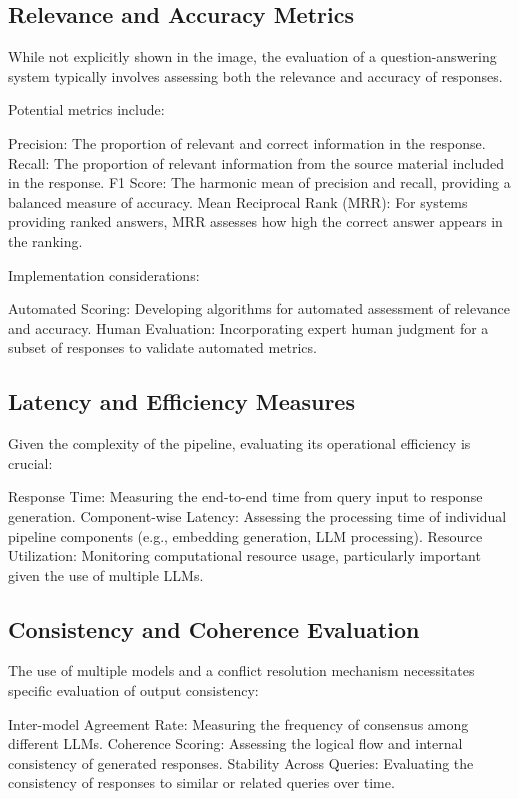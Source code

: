 \subsection{Relevance and Accuracy Metrics}\label{subsec:relevance-and-accuracy-metrics}

While not explicitly shown in the image, the evaluation of a question-answering system typically involves assessing both the relevance and accuracy of responses.

Potential metrics include:

Precision: The proportion of relevant and correct information in the response.
Recall: The proportion of relevant information from the source material included in the response.
F1 Score: The harmonic mean of precision and recall, providing a balanced measure of accuracy.
Mean Reciprocal Rank (MRR): For systems providing ranked answers, MRR assesses how high the correct answer appears in the ranking.

Implementation considerations:

Automated Scoring: Developing algorithms for automated assessment of relevance and accuracy.
Human Evaluation: Incorporating expert human judgment for a subset of responses to validate automated metrics.

\subsection{Latency and Efficiency Measures}\label{subsec:latency-and-efficiency-measures}

Given the complexity of the pipeline, evaluating its operational efficiency is crucial:

Response Time: Measuring the end-to-end time from query input to response generation.
Component-wise Latency: Assessing the processing time of individual pipeline components (e.g., embedding generation, LLM processing).
Resource Utilization: Monitoring computational resource usage, particularly important given the use of multiple LLMs.

\subsection{Consistency and Coherence Evaluation}\label{subsec:consistency-and-coherence-evaluation}

The use of multiple models and a conflict resolution mechanism necessitates specific evaluation of output consistency:

Inter-model Agreement Rate: Measuring the frequency of consensus among different LLMs.
Coherence Scoring: Assessing the logical flow and internal consistency of generated responses.
Stability Across Queries: Evaluating the consistency of responses to similar or related queries over time.

